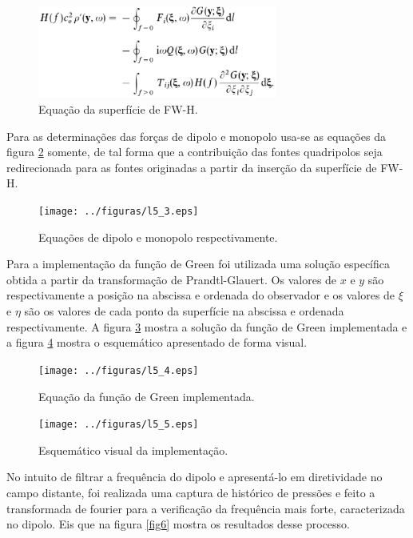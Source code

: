 \begin{figure}[h!]
    \centering
    \hspace{-1.cm}
    \label{fig2}
    \includegraphics[width=0.7\textwidth]{../figuras/l5_2.eps}
    \caption{Equação da superfície de FW-H.}
\end{figure}

Para as determinações das forças de dipolo e monopolo usa-se as equações da figura \ref{fig3} somente, de tal forma que a contribuição das fontes quadripolos seja redirecionada para as fontes originadas a partir da inserção da superfície de FW-H.

\begin{figure}[h!]
    \centering
    \hspace{-1.cm}
    \label{fig3}
    \texttt{[image: ../figuras/l5\_3.eps]}
    \caption{Equações de dipolo e monopolo respectivamente.}
\end{figure}

Para a implementação da função de Green foi utilizada uma solução específica obtida a partir da transformação de Prandtl-Glauert. Os valores de $x$ e $y$ são respectivamente a posição na abscissa e ordenada do observador e os valores de $\xi$ e $\eta$ são os valores de cada ponto da superfície na abscissa e ordenada respectivamente. A figura \ref{fig4} mostra a solução da função de Green implementada e a figura \ref{fig5} mostra o esquemático apresentado de forma visual.

\begin{figure}[h!]
    \centering
    \hspace{-1.cm}
    \label{fig4}
    \texttt{[image: ../figuras/l5\_4.eps]}
    \caption{Equação da função de Green implementada.}
\end{figure}

\begin{figure}[h!]
    \centering
    \hspace{-1.cm}
    \label{fig5}
    \texttt{[image: ../figuras/l5\_5.eps]}
    \caption{Esquemático visual da implementação.}
\end{figure}
 
\newpage
No intuito de filtrar a frequência do dipolo e apresentá-lo em diretividade no campo distante, foi realizada uma captura de histórico de pressões e feito a transformada de fourier para a verificação da frequência mais forte, caracterizada no dipolo. Eis que na figura \ref{fig6} mostra os resultados desse processo.

